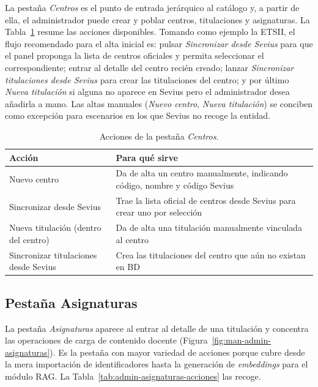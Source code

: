 La pestaña \textit{Centros} es el punto de entrada jerárquico al catálogo y, a partir de ella, el administrador puede crear y poblar centros, titulaciones y asignaturas. La Tabla~\ref{tab:admin-centros-acciones} resume las acciones disponibles. Tomando como ejemplo la ETSII, el flujo recomendado para el alta inicial es: pulsar \textit{Sincronizar desde Sevius} para que el panel proponga la lista de centros oficiales y permita seleccionar el correspondiente; entrar al detalle del centro recién creado; lanzar \textit{Sincronizar titulaciones desde Sevius} para crear las titulaciones del centro; y por último \textit{Nueva titulación} si alguna no aparece en Sevius pero el administrador desea añadirla a mano. Las altas manuales (\textit{Nuevo centro}, \textit{Nueva titulación}) se conciben como excepción para escenarios en los que Sevius no recoge la entidad.

\begin{table}[hbtp]
\centering
\caption{Acciones de la pestaña \textit{Centros}.}\label{tab:admin-centros-acciones}
\begin{tabular}{p{5cm}p{8cm}}
\hline
\textbf{Acción} & \textbf{Para qué sirve} \\
\hline
Nuevo centro & Da de alta un centro manualmente, indicando código, nombre y código Sevius \\
Sincronizar desde Sevius & Trae la lista oficial de centros desde Sevius para crear uno por selección \\
Nueva titulación (dentro del centro) & Da de alta una titulación manualmente vinculada al centro \\
Sincronizar titulaciones desde Sevius & Crea las titulaciones del centro que aún no existan en BD \\
\hline
\end{tabular}
\end{table}

\subsection{Pestaña Asignaturas}\label{subsec:admin-asignaturas}

La pestaña \textit{Asignaturas} aparece al entrar al detalle de una titulación y concentra las operaciones de carga de contenido docente (Figura~\ref{fig:man-admin-asignaturas}). Es la pestaña con mayor variedad de acciones porque cubre desde la mera importación de identificadores hasta la generación de \textit{embeddings} para el módulo RAG. La Tabla~\ref{tab:admin-asignaturas-acciones} las recoge.

